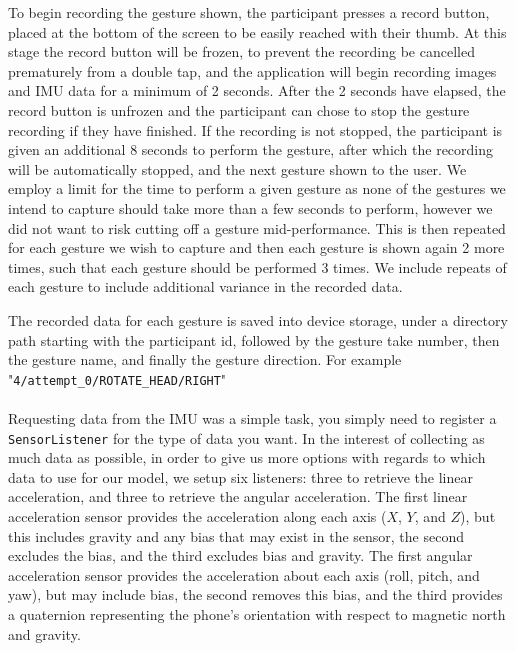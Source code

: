 To begin recording the gesture shown, the participant presses a record button, placed at the bottom of the screen to be easily reached with their thumb. At this stage the record button will be frozen, to prevent the recording be cancelled prematurely from a double tap, and the application will begin recording images and IMU data for a minimum of 2 seconds. After the 2 seconds have elapsed, the record button is unfrozen and the participant can chose to stop the gesture recording if they have finished. If the recording is not stopped, the participant is given an additional 8 seconds to perform the gesture, after which the recording will be automatically stopped, and the next gesture shown to the user.
We employ a limit for the time to perform a given gesture as none of the gestures we intend to capture should take more than a few seconds to perform, however we did not want to risk cutting off a gesture mid-performance.
This is then repeated for each gesture we wish to capture and then each gesture is shown again 2 more times, such that each gesture should be performed 3 times. We include repeats of each gesture to include additional variance in the recorded data.

The recorded data for each gesture is saved into device storage, under a directory path starting with the participant id, followed by the gesture take number, then the gesture name, and finally the gesture direction. For example "\verb|4/attempt_0/ROTATE_HEAD/RIGHT|"
\\\\
Requesting data from the IMU was a simple task, you simply need to register a \verb|SensorListener| for the type of data you want. In the interest of collecting as much data as possible, in order to give us more options with regards to which data to use for our model, we setup six listeners: three to retrieve the linear acceleration, and three to retrieve the angular acceleration.
The first linear acceleration sensor provides the acceleration along each axis ($X$, $Y$, and $Z$), but this includes gravity and any bias that may exist in the sensor, the second excludes the bias, and the third excludes bias and gravity.
The first angular acceleration sensor provides the acceleration about each axis (roll, pitch, and yaw), but may include bias, the second removes this bias, and the third provides a quaternion representing the phone's orientation with respect to magnetic north and gravity.

